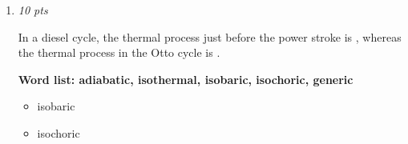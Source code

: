 \documentclass[11pt]{article}
\begin{document}
\begin{enumerate}[leftmargin=*,label=\textbf{Question \arabic*.}]
  ["True", "False"]

\begin{itemize}
  \item False
  \item True
  \item False
  \item True
  \item False
  \item True
  \item True
  \item False
\end{itemize}

\item \hfill \textit{10 pts}

In a diesel cycle, the thermal process just before the power stroke is
, whereas the thermal process in the Otto cycle is
.



\textbf{Word list: adiabatic, isothermal, isobaric, isochoric, generic}

\begin{itemize}
  \item isobaric
  \item isochoric
\end{itemize}

\end{enumerate}
\end{document}
